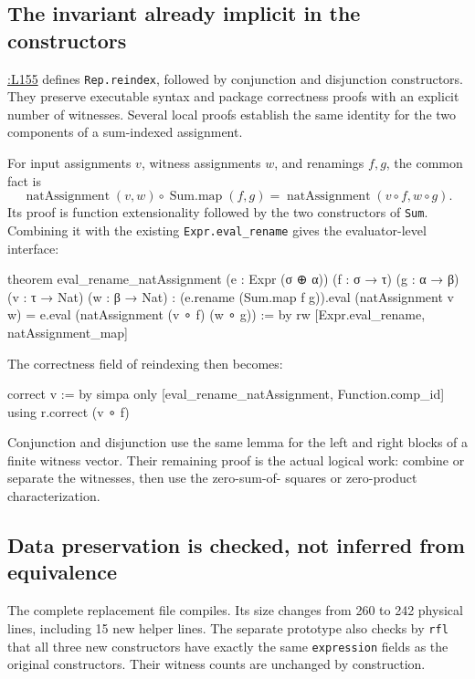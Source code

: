 \documentclass[11pt,letterpaper]{article}
\newcommand{\src}[2]{\href{https://github.com/VladimirReshetnikov/ProveIt/blob/60e9c5d620c6c387d932876cfa2d9376f64ea56c/Computability/DiophantineConsistency/Lean/DiophantineConsistency/#1.lean\#L#2}{\texttt{\detokenize{#1}}:L#2}}
\begin{document}
\subsection{The invariant already implicit in the constructors}

\src{Representation}{155} defines \texttt{Rep.reindex}, followed by
conjunction and disjunction constructors. They preserve executable syntax
and package correctness proofs with an explicit number of witnesses.
Several local proofs establish the same identity for the two components
of a sum-indexed assignment.

For input assignments $v$, witness assignments $w$, and renamings $f,g$,
the common fact is
\[
 \operatorname{natAssignment}(v,w)\circ\operatorname{Sum.map}(f,g)
 =\operatorname{natAssignment}(v\circ f,w\circ g).
\]
Its proof is function extensionality followed by the two constructors of
\texttt{Sum}. Combining it with the existing \texttt{Expr.eval\_rename}
gives the evaluator-level interface:

\begin{LeanCode}
theorem eval_rename_natAssignment (e : Expr (σ ⊕ α))
    (f : σ → τ) (g : α → β) (v : τ → Nat) (w : β → Nat) :
    (e.rename (Sum.map f g)).eval (natAssignment v w) =
      e.eval (natAssignment (v ∘ f) (w ∘ g)) := by
  rw [Expr.eval_rename, natAssignment_map]
\end{LeanCode}

The correctness field of reindexing then becomes:

\begin{LeanCode}
correct v := by
  simpa only [eval_rename_natAssignment, Function.comp_id]
    using r.correct (v ∘ f)
\end{LeanCode}

Conjunction and disjunction use the same lemma for the left and right
blocks of a finite witness vector. Their remaining proof is the actual
logical work: combine or separate the witnesses, then use the zero-sum-of-
squares or zero-product characterization.

\subsection{Data preservation is checked, not inferred from equivalence}

The complete replacement file compiles. Its size changes from 260 to 242
physical lines, including 15 new helper lines. The separate prototype also
checks by \texttt{rfl} that all three new constructors have exactly the same
\texttt{expression} fields as the original constructors. Their witness
counts are unchanged by construction.
\end{document}

